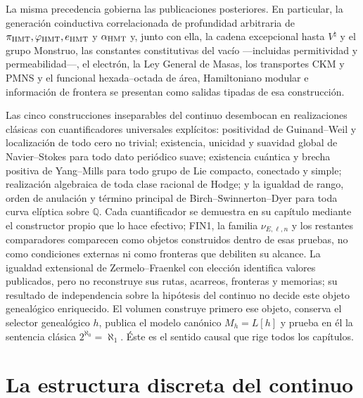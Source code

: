 La misma precedencia gobierna las publicaciones posteriores. En particular,
la generación coinductiva correlacionada de profundidad arbitraria de
\(\pi_{\rm HMT},\varphi_{\rm HMT},e_{\rm HMT}\) y
\(\alpha_{\rm HMT}\)
y, junto con ella, la cadena excepcional hasta \(V^\natural\) y el grupo
Monstruo, las constantes constitutivas del vacío ---incluidas permitividad y
permeabilidad---, el electrón, la Ley General de Masas, los transportes CKM y
PMNS y el funcional hexada--octada de área, Hamiltoniano modular e información
de frontera se presentan como salidas tipadas de esa construcción.

Las cinco construcciones inseparables del continuo desembocan en realizaciones
clásicas con cuantificadores universales explícitos: positividad de
Guinand--Weil y localización de todo cero no trivial; existencia, unicidad y
suavidad global de Navier--Stokes para todo dato periódico suave; existencia
cuántica y brecha positiva de Yang--Mills para todo grupo de Lie compacto,
conectado y simple; realización algebraica de toda clase racional de Hodge; y
la igualdad de rango, orden de anulación y término principal de
Birch--Swinnerton--Dyer para toda curva elíptica sobre \(\mathbb Q\). Cada
cuantificador se demuestra en su capítulo mediante el constructor propio que
lo hace efectivo; FIN1, la familia \(\nu_{E,\ell,n}\) y los restantes
comparadores comparecen como objetos construidos dentro de esas pruebas, no
como condiciones externas ni como fronteras que debiliten su alcance. La igualdad
extensional de Zermelo--Fraenkel con elección identifica valores publicados,
pero no reconstruye sus rutas, acarreos, fronteras y memorias; su resultado de
independencia sobre la hipótesis del continuo no decide este objeto
genealógico enriquecido. El volumen construye primero ese objeto, conserva el
selector genealógico \(h\), publica el modelo canónico \(M_h=L[h]\) y prueba
en él la sentencia clásica \(2^{\aleph_0}=\aleph_1\). Éste es el sentido
causal que rige todos los capítulos.

\section*{La estructura discreta del continuo}

